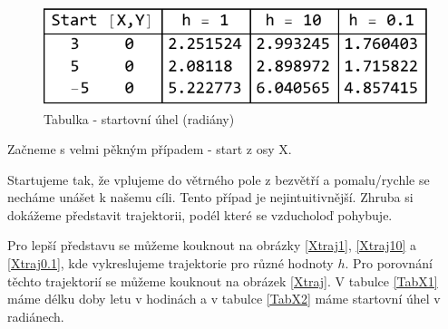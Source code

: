 \documentclass[reqno, a4paper]{amsart}
\numberwithin{equation}{section}
\begin{document}
\begin{figure}
\includegraphics[scale=0.7]{figures/OsaX - tab. beta.pdf}
\caption{Tabulka - startovní úhel (radiány)}
\label{TabX2}
\end{figure}
Začneme s velmi pěkným případem - start z osy X.

Startujeme tak, že vplujeme do větrného pole z bezvětří a pomalu/rychle se necháme unášet k našemu cíli. Tento případ je nejintuitivnější. Zhruba si dokážeme představit trajektorii, podél které se vzducholoď pohybuje.

Pro lepší představu se můžeme kouknout na obrázky \eqref{Xtraj1}, \eqref{Xtraj10} a \eqref{Xtraj0.1}, kde vykreslujeme trajektorie pro různé hodnoty $h$. Pro porovnání těchto trajektorií se můžeme kouknout na obrázek \eqref{Xtraj}. V tabulce \eqref{TabX1} máme délku doby letu v hodinách a v tabulce \eqref{TabX2} máme startovní úhel v radiánech.
\end{document}
